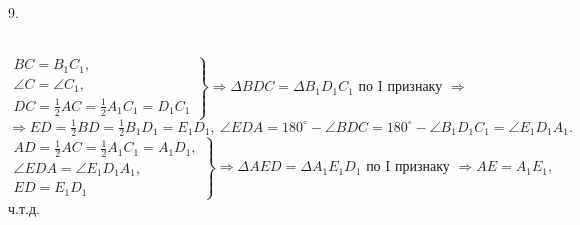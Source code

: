 9. \begin{figure}[ht!]
\end{figure}\\
$\left.\begin{array}{l}BC=B_1C_1,\\
\angle C=\angle C_1,\\
DC=\frac{1}{2}AC=\frac{1}{2}A_1C_1=D_1C_1  \end{array}\right\}\Rightarrow
\Delta BDC=\Delta B_1D_1C_1\text{ по I признаку }\Rightarrow $\\$\Rightarrow ED=\frac{1}{2}BD=\frac{1}{2}B_1D_1=E_1D_1,\ \angle EDA=180^\circ-\angle BDC=180^\circ-\angle B_1D_1C_1=\angle E_1D_1A_1.$\\
$\left.\begin{array}{l}AD=\frac{1}{2}AC=\frac{1}{2}A_1C_1=A_1D_1,\\
\angle EDA=\angle E_1D_1A_1,\\
ED=E_1D_1  \end{array}\right\}\Rightarrow \Delta AED=\Delta A_1E_1D_1\text{ по I признаку }\Rightarrow AE=A_1E_1,$ ч.т.д.\\
